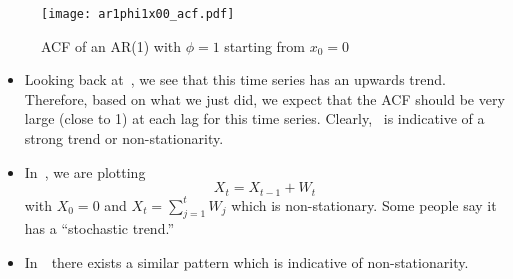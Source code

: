 \begin{figure}[!ht]
    \centering
    \texttt{[image: ar1phi1x00\_acf.pdf]}
    \caption{ACF of an AR(1) with $ \phi=1 $ starting from
        $ x_0=0 $}\label{fig:ar1phi1x00_acf}
\end{figure}
\begin{itemize}
    \item Looking back at~, we see that this time series has an
          upwards trend. Therefore, based on what we just did, we expect
          that the ACF should be very large (close to 1) at each lag
          for this time series. Clearly,~ is indicative
          of a strong trend or non-stationarity.
    \item In~, we are plotting
          \[ X_t=X_{t-1}+W_{t} \]
          with $ X_0=0 $ and $ X_t=\sum_{j=1}^{t} W_j $ which is
          non-stationary. Some people say it has a ``stochastic trend.''
    \item In~~there exists a
          similar pattern which is indicative of non-stationarity.
\end{itemize}
